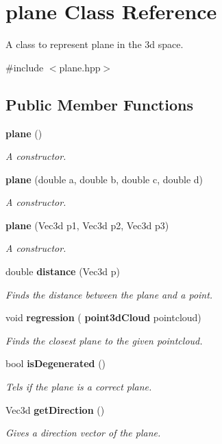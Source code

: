 \section{plane Class Reference}
\label{classplane}


A class to represent plane in the 3d space.  




{\ttfamily \#include $<$plane.\+hpp$>$}

\subsection*{Public Member Functions}
\begin{DoxyCompactItemize}
\item 
\textbf{ plane} ()
\begin{DoxyCompactList}\small\item\em A constructor. \end{DoxyCompactList}\item 
\textbf{ plane} (double a, double b, double c, double d)
\begin{DoxyCompactList}\small\item\em A constructor. \end{DoxyCompactList}\item 
\textbf{ plane} (Vec3d p1, Vec3d p2, Vec3d p3)
\begin{DoxyCompactList}\small\item\em A constructor. \end{DoxyCompactList}\item 
double \textbf{ distance} (Vec3d p)
\begin{DoxyCompactList}\small\item\em Finds the distance between the plane and a point. \end{DoxyCompactList}\item 
void \textbf{ regression} (\textbf{ point3d\+Cloud} pointcloud)
\begin{DoxyCompactList}\small\item\em Finds the closest plane to the given pointcloud. \end{DoxyCompactList}\item 
bool \textbf{ is\+Degenerated} ()
\begin{DoxyCompactList}\small\item\em Tels if the plane is a correct plane. \end{DoxyCompactList}\item 
Vec3d \textbf{ get\+Direction} ()
\begin{DoxyCompactList}\small\item\em Gives a direction vector of the plane. \end{DoxyCompactList}\end{DoxyCompactItemize}
